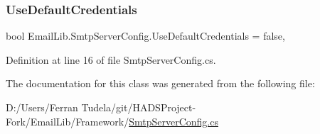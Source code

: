 \subsubsection{\texorpdfstring{UseDefaultCredentials}{UseDefaultCredentials}}
{\footnotesize\ttfamily bool Email\+Lib.\+Smtp\+Server\+Config.\+Use\+Default\+Credentials = false\hspace{0.3cm}{\ttfamily [get]}, {\ttfamily [set]}}



Definition at line 16 of file Smtp\+Server\+Config.\+cs.



The documentation for this class was generated from the following file\+:\begin{DoxyCompactItemize}
\item 
D\+:/\+Users/\+Ferran Tudela/git/\+H\+A\+D\+S\+Project-\/\+Fork/\+Email\+Lib/\+Framework/\mbox{\hyperlink{SmtpServerConfig_8cs}{Smtp\+Server\+Config.\+cs}}\end{DoxyCompactItemize}
